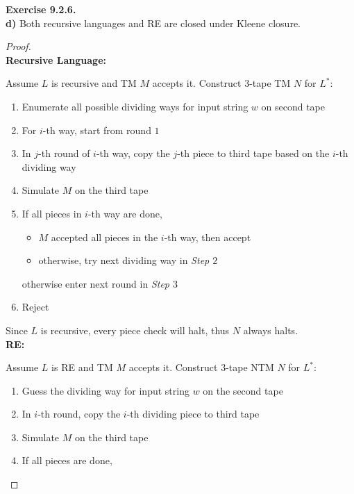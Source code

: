 \documentclass[a4paper]{article}
\newtheorem*{proof}{Proof}
\newenvironment{exercise}[1]{
	\par
	\noindent\textbf{Exercise #1.}\quad
}{
	\par
	\bigskip
}
\begin{document}
\begin{exercise}{9.2.6} \hspace{0pt}\\
\textbf{d)} Both recursive languages and RE are closed under Kleene closure.
    \begin{proof}\hspace{0pt}\\
        \textbf{Recursive Language:}\par
        Assume $L$ is recursive and TM $M$ accepts it. Construct $3$-tape TM $N$ for $L^*$:
        \begin{enumerate}
            \item Enumerate all possible dividing ways for input string $w$ on second tape
            \item For $i$-th way, start from round $1$
            \item In $j$-th round of $i$-th way, copy the $j$-th piece to third tape
                based on the $i$-th dividing way
            \item Simulate $M$ on the third tape
            \item If all pieces in $i$-th way are done,
                \begin{itemize}
                    \item $M$ accepted all pieces in the $i$-th way, then accept
                    \item otherwise, try next dividing way in \textit{Step $2$}
                \end{itemize}
                otherwise enter next round in \textit{Step $3$}
            \item Reject
        \end{enumerate}
        Since $L$ is recursive, every piece check will halt, thus $N$ always halts.\\
        \textbf{RE:}\par
        Assume $L$ is RE and TM $M$ accepts it. Construct $3$-tape NTM $N$ for $L^*$:
        \begin{enumerate}
            \item Guess the dividing way for input string $w$ on the second tape
            \item In $i$-th round, copy the $i$-th dividing piece to third tape
            \item Simulate $M$ on the third tape
            \item If all pieces are done,
                \begin{itemize}

\end{itemize}
\end{enumerate}
\end{proof}
\end{exercise}
\end{document}

